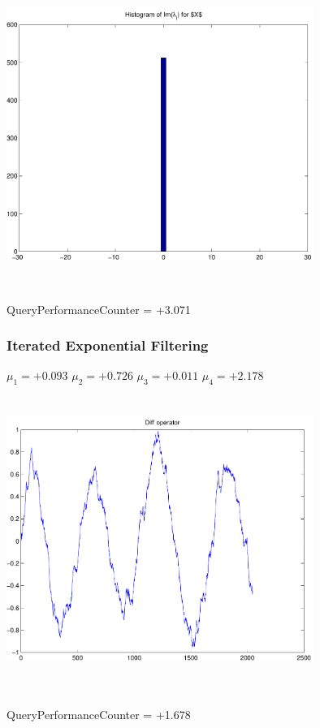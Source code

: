 \documentclass[9pt]{article}
\theoremstyle{plain}
\theoremstyle{definition}
\theoremstyle{remark}
\numberwithin{equation}{section}
\begin{document}
\includegraphics[width=10.0cm,height=10.0cm]{Im_lambda_n.pdf}

QueryPerformanceCounter  =  +3.071
\subsubsection{Iterated Exponential Filtering }
$\mu_1 =+0.093$
$\mu_2 =+0.726$
$\mu_3 =+0.011$
$\mu_4 =+2.178$
\includegraphics[width=10.0cm,height=10.0cm]{DIFF.pdf}

QueryPerformanceCounter  =  +1.678
\end{document}
